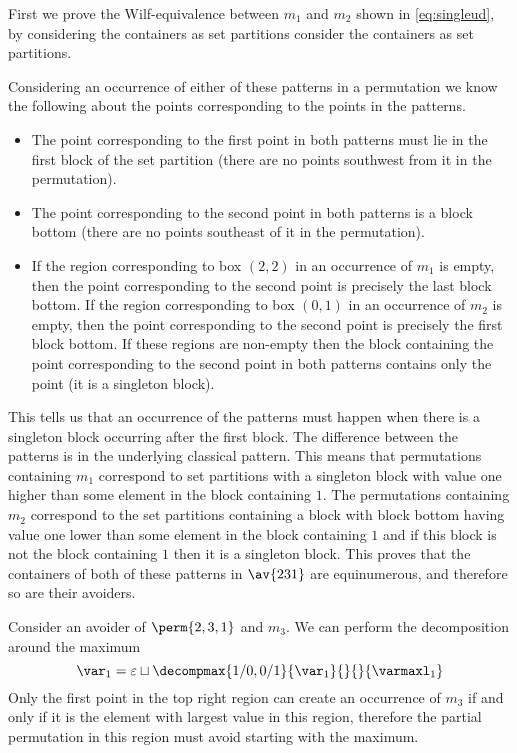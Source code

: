 First we prove the Wilf-equivalence between \(m_1\) and \(m_2\) shown in
\eqref{eq:singleud}, by considering the containers as set partitions consider
the containers as set partitions.

Considering an occurrence of either of these patterns in a permutation  we know
the following about the points corresponding to the points in the patterns.
\begin{itemize}
    \item The point corresponding to the first point in both patterns
        must lie in the first block of the set partition (there are
        no points southwest from it in the permutation).
    \item The point corresponding to the second point in both patterns
        is a block bottom (there are no points southeast of it in
        the permutation).
    \item If the region corresponding to box \((2,2)\) in an occurrence of
    \(m_1\) is empty, then the point corresponding to the second point is
    precisely the last block bottom. If the region corresponding to box \((0,1)\)
    in an occurrence of \(m_2\) is empty, then the point corresponding to the
    second point is precisely the first block bottom.
    If these regions are non-empty then the block containing the point
    corresponding to the second point in both patterns contains only the point
    (it is a singleton block).
\end{itemize}
This tells us that an occurrence of the patterns must happen when there
is a singleton block occurring after the first block. The difference
between the patterns is in the underlying classical pattern. This
means that permutations containing \(m_1\) correspond to set partitions
with a singleton block with value one higher than some element in the
block containing \(1\). The permutations containing \(m_2\) correspond
to the set partitions containing a block with block bottom having value
one lower than some element in the block containing \(1\) and if this
block is not the block containing \(1\) then it is a singleton block. This
proves that the containers of both of these patterns in \(\av{231}\) are
equinumerous, and therefore so are their avoiders.

Consider an avoider of \(\perm{2,3,1}\) and \(m_3\). We can perform
the decomposition around the maximum
\begin{equation*}
    \scriptvar_1 = \varepsilon \sqcup
    \decompmax{1/0,0/1}{\scriptvar_1}{}{}{\mathcal{\varmaxl}_1}
\end{equation*}
Only the first point in the top right region can
create an occurrence of \(m_3\) if and only if it is the
element with largest value in this region, therefore the partial permutation
in this region must avoid starting with the maximum.

